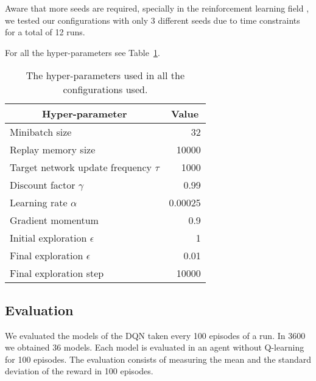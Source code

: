 Aware that more seeds are required, specially in the reinforcement learning field \cite{DBLP:journals/corr/abs-1709-06560}, we tested our configurations with only 3 different seeds due to time constraints for a total of 12 runs.

For all the hyper-parameters see Table~\ref{tab:my-hyperparams}.

\begin{table}
	\centering
	\begin{tabular}{|l|r|}
		\hline
		\multicolumn{1}{|c|}{\textbf{Hyper-parameter}} &
		\multicolumn{1}{|c|}{\textbf{Value}}        \\
		\hline
		Minibatch size & 32 \\
		Replay memory size & 10000 \\
		Target network update frequency $\tau$ & 1000 \\
		Discount factor $\gamma$ & 0.99 \\
		Learning rate $\alpha$ & 0.00025 \\
		Gradient momentum & 0.9 \\
		Initial exploration $\epsilon$ & 1 \\
		Final exploration $\epsilon$ & 0.01 \\
		Final exploration step & 10000 \\
		\hline
	\end{tabular}
	
	\caption{The hyper-parameters used in all the configurations used.}
	\label{tab:my-hyperparams}
\end{table}



\subsection{Evaluation}

We evaluated the models of the DQN taken every 100 episodes of a run. In 3600 we obtained 36 models. Each model is evaluated in an agent without Q-learning for 100 episodes. The evaluation consists of measuring the mean and the standard deviation of the reward in 100 episodes.



